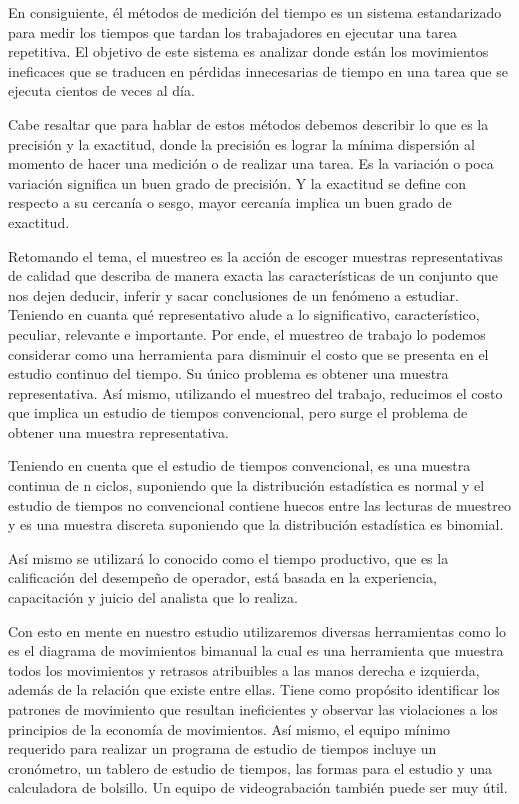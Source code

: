     En consiguiente, él métodos de medición del tiempo es un sistema estandarizado para medir los tiempos que tardan los trabajadores en ejecutar una tarea repetitiva. El objetivo de este sistema es analizar donde están los movimientos ineficaces que se traducen en pérdidas innecesarias de tiempo en una tarea que se ejecuta cientos de veces al día. \cite{DanielGrifol}
    
    Cabe resaltar que para hablar de estos métodos debemos describir lo que es la precisión y la exactitud, donde la precisión es lograr la mínima dispersión al momento de hacer una medición o de realizar una tarea. Es la variación o poca variación significa un buen grado de precisión. Y la exactitud se define con respecto a su cercanía o sesgo, mayor cercanía implica un buen grado de exactitud.
    
    Retomando el tema, el muestreo es la acción de escoger muestras representativas de calidad que describa de manera exacta las características de un conjunto que nos dejen deducir, inferir y sacar conclusiones de un fenómeno a estudiar. \cite{RAE} Teniendo en cuanta qué representativo alude a lo significativo, característico, peculiar, relevante e importante. \cite{RAE}
    Por ende, el muestreo de trabajo lo podemos considerar como una herramienta para disminuir el costo que se presenta  en el estudio continuo del tiempo. Su único problema es obtener una muestra representativa. Así mismo, utilizando el muestreo del trabajo, reducimos el costo que implica un estudio de tiempos convencional, pero surge el problema de obtener una muestra representativa.
    
    Teniendo en cuenta que el estudio de tiempos convencional, es una muestra continua de n ciclos, suponiendo que la distribución estadística es normal y el estudio de tiempos no convencional contiene huecos entre las lecturas de muestreo y es una muestra discreta suponiendo que la distribución estadística es binomial.
    
    
    Así mismo se utilizará lo conocido como el tiempo productivo, que es la calificación del desempeño de operador, está basada en la experiencia, capacitación y juicio del analista que lo realiza.
    
    
    Con esto en mente en nuestro estudio utilizaremos diversas herramientas como lo es el diagrama de movimientos bimanual la cual es una herramienta que muestra todos los movimientos y retrasos atribuibles a las manos derecha e izquierda, además de la relación que existe entre ellas. Tiene como propósito identificar los patrones de movimiento que resultan ineficientes y observar las violaciones a los principios de la economía de movimientos.\cite{niebel1980ingenieria} Así mismo, el equipo mínimo requerido para realizar un programa de estudio de tiempos incluye un cronómetro, un tablero de estudio de tiempos, las formas para el estudio y una calculadora de bolsillo. Un equipo de videograbación también puede ser muy útil.
    
